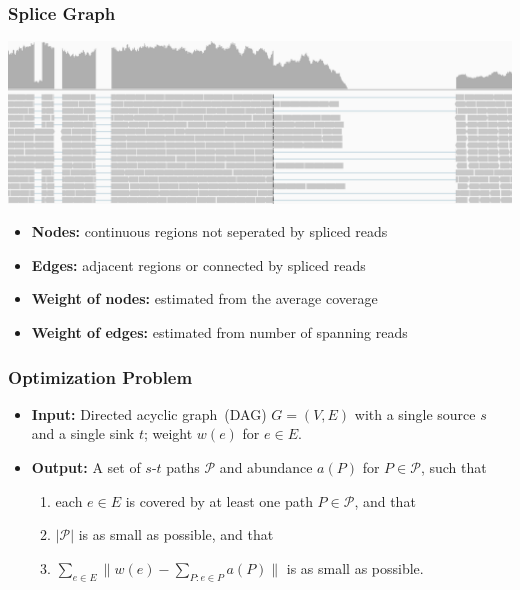 \frame
{
	\frametitle{Splice Graph}
	\includegraphics[width=\textwidth]{figures/reference.pdf}
	\vspace{0.2cm}
	
	\vspace{-0.4cm}
	
	\vspace{0.2cm}
	\begin{itemize}
	\item<3-> {\bf Nodes:} continuous regions not seperated by spliced reads
	\item<3-> {\bf Edges:} adjacent regions or connected by spliced reads
	\item<4-> {\bf Weight of nodes:} estimated from the average coverage
	\item<4-> {\bf Weight of edges:} estimated from number of spanning reads
	\end{itemize}
}

\frame
{
	\frametitle{Optimization Problem}

	\begin{itemize}
	\item {\bf Input:} Directed acyclic graph~(DAG) $G=(V,E)$ with a single source $s$ and a single sink $t$;
		weight $w(e)$ for $e\in E$.

	\vspace{1.0cm}
	
	\vspace{1.0cm}

	\vspace{0.5cm}

	\item<2-> {\bf Output:} A set of $s$-$t$ paths $\mathcal{P}$ and abundance $a(P)$ for $P\in\mathcal{P}$, such that
		\begin{enumerate}
		\vspace{0.1cm}
		\item each $e\in E$ is covered by at least one path $P\in\mathcal{P}$, and that
		\vspace{0.1cm}
		\item $|\mathcal{P}|$ is as small as possible, and that
		\vspace{0.1cm}
		\item $\sum_{e\in E} \|w(e) - \sum_{P:e\in P} a(P)\|$ is as small as possible.
		\end{enumerate}
	\end{itemize}

}

